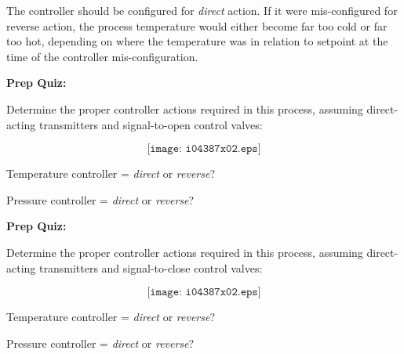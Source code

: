 






The controller should be configured for {\it direct} action.  If it were mis-configured for reverse action, the process temperature would either become far too cold or far too hot, depending on where the temperature was in relation to setpoint at the time of the controller mis-configuration.

\vfil \eject

\noindent
{\bf Prep Quiz:}

Determine the proper controller actions required in this process, assuming direct-acting transmitters and signal-to-open control valves:

$$\texttt{[image: i04387x02.eps]}$$

Temperature controller = {\it direct} or {\it reverse}?

\vskip 10pt

Pressure controller = {\it direct} or {\it reverse}?

\vfil \eject

\noindent
{\bf Prep Quiz:}

Determine the proper controller actions required in this process, assuming direct-acting transmitters and signal-to-close control valves:

$$\texttt{[image: i04387x02.eps]}$$

Temperature controller = {\it direct} or {\it reverse}?

\vskip 10pt

Pressure controller = {\it direct} or {\it reverse}?





